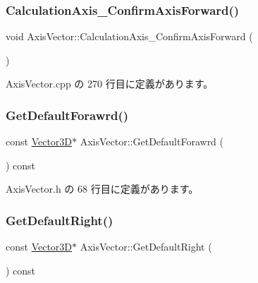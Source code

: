 \subsubsection{\texorpdfstring{Calculation\+Axis\+\_\+\+Confirm\+Axis\+Forward()}{CalculationAxis\_ConfirmAxisForward()}}
{\footnotesize\ttfamily void Axis\+Vector\+::\+Calculation\+Axis\+\_\+\+Confirm\+Axis\+Forward (\begin{DoxyParamCaption}{ }\end{DoxyParamCaption})\hspace{0.3cm}{\ttfamily [private]}}



 Axis\+Vector.\+cpp の 270 行目に定義があります。

\mbox{\label{class_axis_vector_a83ead17514eb08954dc74c0e72b6158c}} 
\subsubsection{\texorpdfstring{Get\+Default\+Forawrd()}{GetDefaultForawrd()}}
{\footnotesize\ttfamily const \mbox{\hyperlink{class_vector3_d}{Vector3D}}$\ast$ Axis\+Vector\+::\+Get\+Default\+Forawrd (\begin{DoxyParamCaption}{ }\end{DoxyParamCaption}) const\hspace{0.3cm}{\ttfamily [inline]}}



 Axis\+Vector.\+h の 68 行目に定義があります。

\mbox{\label{class_axis_vector_aacf0879e0b9ace6cfbd29c8a300cd960}} 
\subsubsection{\texorpdfstring{Get\+Default\+Right()}{GetDefaultRight()}}
{\footnotesize\ttfamily const \mbox{\hyperlink{class_vector3_d}{Vector3D}}$\ast$ Axis\+Vector\+::\+Get\+Default\+Right (\begin{DoxyParamCaption}{ }\end{DoxyParamCaption}) const\hspace{0.3cm}{\ttfamily [inline]}}



